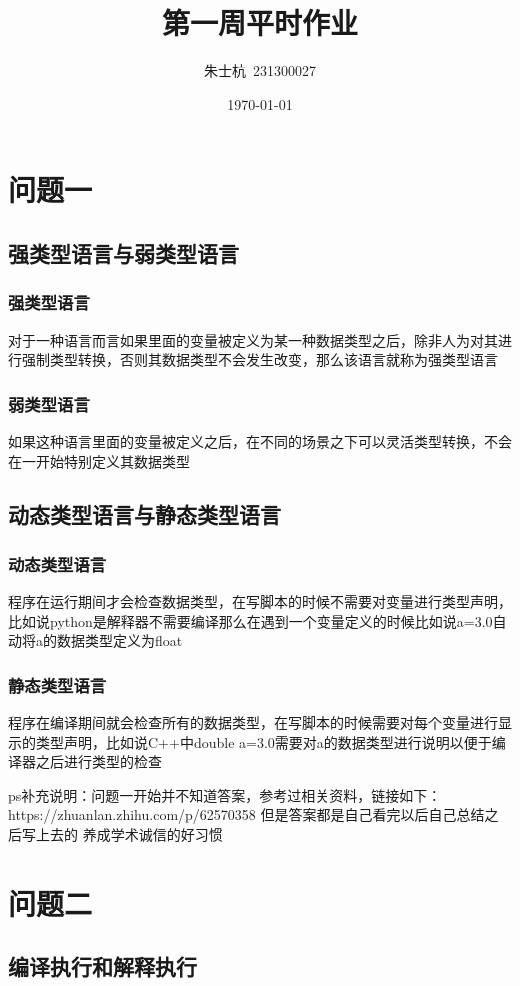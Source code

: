 \documentclass[10pt]{article}
\title{第一周平时作业}
\author{朱士杭\ 231300027}
\date{\kaishu \today}
\begin{document}
	\maketitle
\section{问题一}
	\subsection{强类型语言与弱类型语言}
		\subsubsection{强类型语言}
	对于一种语言而言如果里面的变量被定义为某一种数据类型之后，除非人为对其进行强制类型转换，否则其数据类型不会发生改变，那么该语言就称为强类型语言
		\subsubsection{弱类型语言}
	如果这种语言里面的变量被定义之后，在不同的场景之下可以灵活类型转换，不会在一开始特别定义其数据类型
	\subsection{动态类型语言与静态类型语言}
		\subsubsection{动态类型语言}
	程序在运行期间才会检查数据类型，在写脚本的时候不需要对变量进行类型声明，比如说python是解释器不需要编译那么在遇到一个变量定义的时候比如说a=3.0自动将a的数据类型定义为float
		\subsubsection{静态类型语言}
	程序在编译期间就会检查所有的数据类型，在写脚本的时候需要对每个变量进行显示的类型声明，比如说C++中double a=3.0需要对a的数据类型进行说明以便于编译器之后进行类型的检查
	
	ps补充说明：问题一开始并不知道答案，参考过相关资料，链接如下：https://zhuanlan.zhihu.com/p/62570358 但是答案都是自己看完以后自己总结之后写上去的   养成学术诚信的好习惯
	
\section{问题二}
	\subsection{编译执行和解释执行}
\end{document}
